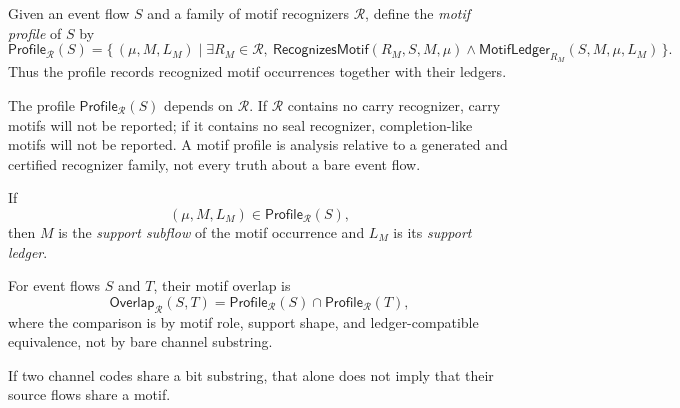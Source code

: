 \begin{definition}
\label{def:motif-generated-profile}
Given an event flow $S$ and a family of motif recognizers $\mathcal R$, define the \emph{motif profile} of $S$ by
$$
  \mathsf{Profile}_{\mathcal R}(S)
  =
  \{\,(\mu,M,L_M)\mid
  \exists R_M\in\mathcal R,\ 
  \mathsf{RecognizesMotif}(R_M,S,M,\mu)
  \wedge
  \mathsf{MotifLedger}_{R_M}(S,M,\mu,L_M)\,\}.
$$
Thus the profile records recognized motif occurrences together with their ledgers.
\end{definition}

\begin{remark}
\label{rem:motif-generated-profile-depends-on-recognizers}
The profile $\mathsf{Profile}_{\mathcal R}(S)$ depends on $\mathcal R$. If $\mathcal R$ contains no carry recognizer, carry motifs will not be reported; if it contains no seal recognizer, completion-like motifs will not be reported. A motif profile is analysis relative to a generated and certified recognizer family, not every truth about a bare event flow.
\end{remark}

\begin{definition}
\label{def:motif-generated-support}
If
$$
  (\mu,M,L_M)\in\mathsf{Profile}_{\mathcal R}(S),
$$
then $M$ is the \emph{support subflow} of the motif occurrence and $L_M$ is its \emph{support ledger}.
\end{definition}

\begin{definition}
\label{def:motif-generated-overlap}
For event flows $S$ and $T$, their motif overlap is
$$
  \mathsf{Overlap}_{\mathcal R}(S,T)
  =
  \mathsf{Profile}_{\mathcal R}(S)
  \cap
  \mathsf{Profile}_{\mathcal R}(T),
$$
where the comparison is by motif role, support shape, and ledger-compatible equivalence, not by bare channel substring.
\end{definition}

\begin{proposition}
\label{prop:motif-generated-channel-overlap-insufficient}
If two channel codes share a bit substring, that alone does not imply that their source flows share a motif.
\end{proposition}

